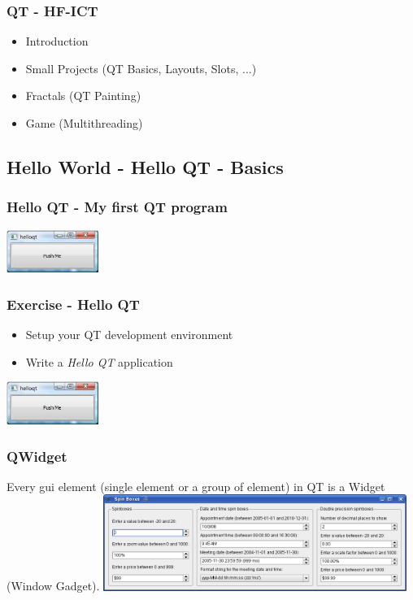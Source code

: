 \frame
{
\frametitle{QT - HF-ICT}
\begin{itemize}
\item Introduction
\item Small Projects (QT Basics, Layouts, Slots, ...)
\item Fractals (QT Painting)
\item Game (Multithreading)
\end{itemize}
}

\subsection{Hello World - Hello QT - Basics}
\frame
{
\frametitle{Hello QT - My first QT program}

\includegraphics[width=85pt]{img/helloqt.png}
}

\frame
{
\frametitle{Exercise - Hello QT}
\begin{exercise}
\begin{itemize}
\item Setup your QT development environment
\item Write a \emph{Hello QT} application
\end{itemize}
\includegraphics[width=85pt]{img/helloqt.png}
\end{exercise}
}

\begin{frame}[fragile]
\frametitle{QWidget}
Every gui element (single element or a group of element) in QT is a Widget (Window Gadget).
\vspace{5mm}
\includegraphics[width=280pt]{img/widget.png}
\end{frame}

